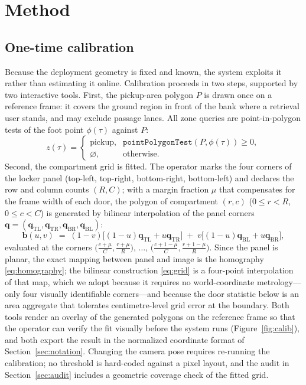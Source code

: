 \documentclass[journal,article,submit,oneauthor]{Definitions/mdpi}
\begin{document}
\section{Method}
\label{sec:method}

\subsection{One-time calibration}
\label{sec:calib}
Because the deployment geometry is fixed and known, the system exploits it rather than
estimating it online. Calibration proceeds in two steps, supported by two interactive tools.
First, the pickup-area polygon $P$ is drawn once on a reference frame: it covers the ground
region in front of the bank where a retrieval user stands, and may exclude passage lanes. All
zone queries are point-in-polygon tests of the foot point $\phi(\tau)$ against $P$:
\begin{equation}
\label{eq:zone}
z(\tau) =
\begin{cases}
\text{pickup}, & \texttt{pointPolygonTest}(P,\phi(\tau)) \ge 0,\\
\varnothing, & \text{otherwise.}
\end{cases}
\end{equation}
Second, the compartment grid is fitted. The operator marks the four corners of the locker
panel (top-left, top-right, bottom-right, bottom-left) and declares the row and column
counts $(R,C)$; with a margin fraction $\mu$ that compensates for the frame width of each
door, the polygon of compartment $(r,c)$ ($0\le r<R$, $0\le c<C$) is generated by bilinear
interpolation of the panel corners $\mathbf{q}=(\mathbf{q}_{\mathrm{TL}},
\mathbf{q}_{\mathrm{TR}},\mathbf{q}_{\mathrm{BR}},\mathbf{q}_{\mathrm{BL}})$:
\begin{equation}
\label{eq:grid}
\mathbf{b}(u,v) \;=\; (1-v)\bigl[(1-u)\mathbf{q}_{\mathrm{TL}}+u\mathbf{q}_{\mathrm{TR}}\bigr]
\;+\; v\bigl[(1-u)\mathbf{q}_{\mathrm{BL}}+u\mathbf{q}_{\mathrm{BR}}\bigr],
\end{equation}
evaluated at the corners $\bigl(\frac{c+\mu}{C}, \frac{r+\mu}{R}\bigr)$, $\dots$,
$\bigl(\frac{c+1-\mu}{C}, \frac{r+1-\mu}{R}\bigr)$. Since the panel is planar, the exact
mapping between panel and image is the homography \eqref{eq:homography}; the bilinear
construction \eqref{eq:grid} is a four-point interpolation of that map, which we adopt
because it requires no world-coordinate metrology---only four visually identifiable
corners---and because the door statistic below is an area aggregate that tolerates
centimetre-level grid error at the boundary. Both tools render an overlay of the generated
polygons on the reference frame so that the operator can verify the fit visually before the
system runs (Figure~\ref{fig:calib}), and both export the result in the normalized coordinate
format of Section~\ref{sec:notation}. Changing the camera pose requires re-running the
calibration; no threshold is hard-coded against a pixel layout, and the audit in
Section~\ref{sec:audit} includes a geometric coverage check of the fitted grid.
\end{document}
